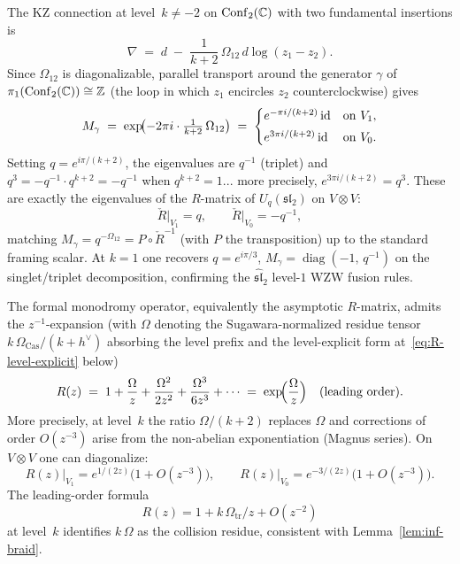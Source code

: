 \begin{computation}
\label{comp:kz-monodromy-conf2}
The KZ connection at level~$k\neq -2$ on
$\mathrm{Conf}_2(\mathbb C)$ with two fundamental insertions is
\[
 \nabla \;=\; d \;-\; \frac{1}{k+2}\,\Omega_{12}\,d\log(z_1-z_2).
\]
Since $\Omega_{12}$ is diagonalizable, parallel transport around
the generator $\gamma$ of $\pi_1(\mathrm{Conf}_2(\mathbb C))\cong\mathbb Z$
(the loop in which $z_1$ encircles $z_2$ counterclockwise) gives
\begin{equation}\label{eq:conf2-monodromy}
 M_\gamma
 \;=\;
 \exp\!\bigl(-2\pi i\cdot\tfrac{1}{k+2}\,\Omega_{12}\bigr)
 \;=\;
 \begin{cases}
 e^{-\pi i/(k+2)}\,\mathrm{id} & \text{on } V_1, \\[3pt]
 e^{3\pi i/(k+2)}\,\mathrm{id} & \text{on } V_0.
 \end{cases}
\end{equation}
Setting $q=e^{i\pi/(k+2)}$, the eigenvalues are $q^{-1}$ (triplet) and $q^3=-q^{-1}\cdot q^{k+2}=-q^{-1}$
when $q^{k+2}=1$... more precisely, $e^{3\pi i/(k+2)}=q^3$.
These are exactly the eigenvalues of the $R$-matrix of $U_q(\mathfrak{sl}_2)$
on $V\otimes V$:
\[
 \check{R}\big|_{V_1}=q,\qquad \check{R}\big|_{V_0}=-q^{-1},
\]
matching $M_\gamma = q^{-\Omega_{12}} = P\circ \check{R}^{-1}$
(with $P$ the transposition) up to the standard framing scalar.
At $k=1$ one recovers $q=e^{i\pi/3}$, $M_\gamma=\operatorname{diag}(-1,\,q^{-1})$
on the singlet/triplet decomposition, confirming the
$\widehat{\mathfrak{sl}}_2$ level-$1$ WZW fusion rules.
\end{computation}

\begin{computation}
\label{comp:formal-R-expansion}
The formal monodromy operator, equivalently the asymptotic $R$-matrix,
admits the $z^{-1}$-expansion (with $\Omega$ denoting the Sugawara-normalized
residue tensor $k\,\Omega_{\mathrm{Cas}}/(k+h^\vee)$ absorbing the level prefix and the level-explicit form at~\eqref{eq:R-level-explicit} below)
\begin{equation}\label{eq:R-formal-expansion}
 R(z) \;=\; 1 + \frac{\Omega}{z} + \frac{\Omega^2}{2z^2} + \frac{\Omega^3}{6z^3}+\cdots
 \;=\; \exp\!\Bigl(\frac{\Omega}{z}\Bigr)\quad (\text{leading order}).
\end{equation}
More precisely, at level~$k$ the ratio $\Omega/(k+2)$ replaces $\Omega$
and corrections of order $O(z^{-3})$ arise from the non-abelian exponentiation
(Magnus series). On $V\otimes V$ one can diagonalize:
\[
 R(z)\big|_{V_1} = e^{1/(2z)}\bigl(1+O(z^{-3})\bigr),
 \qquad
 R(z)\big|_{V_0} = e^{-3/(2z)}\bigl(1+O(z^{-3})\bigr).
\]
The leading-order formula
\begin{equation}\label{eq:R-level-explicit}
 R(z)=1+k\,\Omega_{\mathrm{tr}}/z+O(z^{-2})
\end{equation}
at level~$k$ identifies $k\,\Omega$ as the collision residue, consistent with
Lemma~\ref{lem:inf-braid}.
\end{computation}

